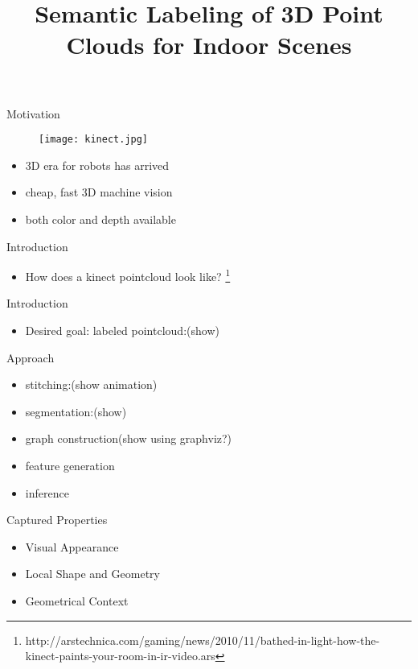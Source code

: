 \documentclass{beamer}
\title{Semantic Labeling of 3D Point Clouds for Indoor Scenes}
\begin{document}
\begin{frame}
\titlepage
\end{frame}

\begin{frame}{Motivation}
	\begin{figure}[t!]
		\texttt{[image: kinect.jpg]}
	\end{figure}

	\begin{itemize}
		\item 3D era for robots has arrived 
		\item  cheap, fast 3D machine vision
		\item  both color and depth available
	\end{itemize}

\end{frame}

\begin{frame}{Introduction}
	\begin{itemize}
		\item How does a kinect pointcloud look like? \footnote{http://arstechnica.com/gaming/news/2010/11/bathed-in-light-how-the-kinect-paints-your-room-in-ir-video.ars}

	\end{itemize}
\end{frame}

\begin{frame}{Introduction}
	\begin{itemize}
		\item Desired goal: labeled pointcloud:(show)

	\end{itemize}
\end{frame}

\begin{frame}{Approach}
	\begin{itemize}
		\item stitching:(show animation)
		\item  segmentation:(show)
		\item  graph construction(show using graphviz?)
		\item  feature generation
		\item  inference
	\end{itemize}

\end{frame}

\begin{frame}{Captured Properties}
	\begin{itemize}
		\item Visual Appearance
		\item  Local Shape and Geometry
		\item  Geometrical Context
	\end{itemize}

\end{frame}
\end{document}
